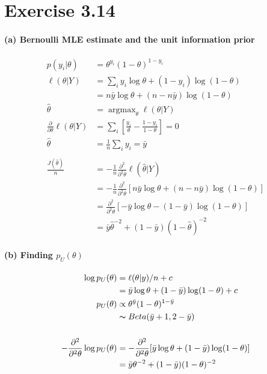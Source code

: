 \documentclass[11pt, letterpaper]{article}
\begin{document}
\section{Exercise 3.14}
\paragraph{(a) Bernoulli MLE estimate and the unit information prior}
\begin{align*}
    p(y_i|\theta) &= \theta^{y_i} (1-\theta)^{1-y_i} \\
    \ell(\theta|Y) &= \sum_i y_i\log\theta + (1-y_i)\log(1-\theta) \\
        &= n\bar{y}\log\theta + (n-n\bar{y})\log(1-\theta) \\
    \hat{\theta} &= \mathop{\arg\max}_{\theta} \ell(\theta|Y) \\
    \frac{\partial}{\partial \theta} \ell(\theta|Y) &= \sum_i [\frac{y_i}{\theta} - \frac{1-y_i}{1-\theta}] = 0 \\
    \hat{\theta} &= \frac{1}{n}\sum_i y_i = \bar{y} \\ \\
    \frac{J(\hat{\theta})}{n} &= -\frac{1}{n}\frac{\partial^2}{\partial^2\theta}\ell(\hat{\theta}|Y) \\
        &= -\frac{1}{n}\frac{\partial^2}{\partial^2\theta}[n\bar{y}\log\theta + (n-n\bar{y})\log(1-\theta)] \\
        &= \frac{\partial^2}{\partial^2\theta}[-\bar{y}\log\theta - (1-\bar{y})\log(1-\theta)] \\
        &= \bar{y}\hat{\theta}^{-2} + (1-\bar{y})(1-\hat{\theta})^{-2}
\end{align*}

\paragraph{(b) Finding $p_U(\theta)$}
\begin{align*}
    \log p_U(\theta) &= \ell(\theta|y)/n + c \\
        &= \bar{y}\log\theta + (1-\bar{y})\log(1-\theta) + c \\
    p_U(\theta) &\propto \theta^{\bar{y}} (1-\theta)^{1-\bar{y}} \\
        &\thicksim Beta(\bar{y}+1, 2-\bar{y}) \\ \\
    -\frac{\partial^2}{\partial^2\theta}\log p_U(\theta)
        &= -\frac{\partial^2}{\partial^2\theta} [\bar{y}\log\theta + (1-\bar{y})\log(1-\theta)] \\
        &= \bar{y}\theta^{-2} + (1-\bar{y})(1-\theta)^{-2}
\end{align*}
\end{document}
